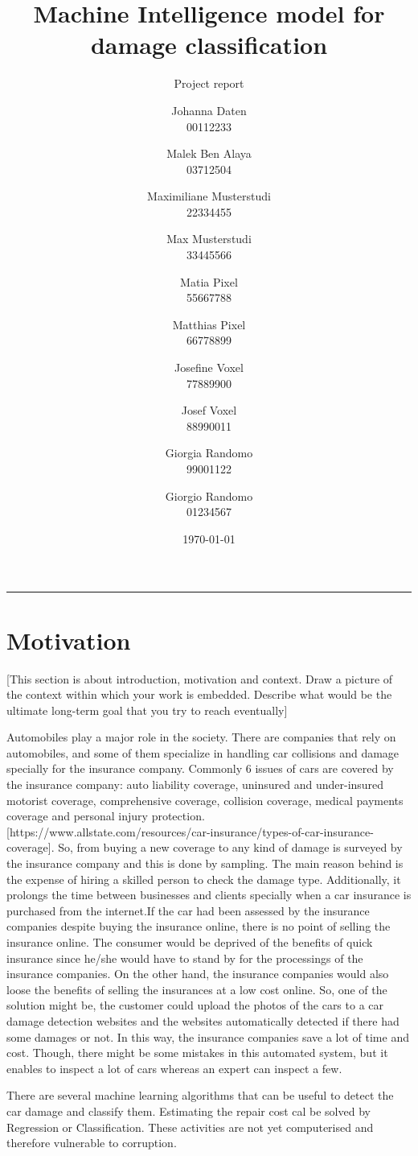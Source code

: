 \documentclass[lang=english,inputenc=utf8,fontsize=10pt]{ldvarticle}
\title{Machine Intelligence model for damage classification}
\subtitle{Project report}
\author{Johanna Daten\\
00112233
\and
Malek Ben Alaya\\
03712504
\and
Maximiliane Musterstudi\\
22334455
\and
Max Musterstudi\\
33445566
\and
Matia Pixel\\
55667788
\and
Matthias Pixel\\
66778899
\and
Josefine Voxel\\
77889900
\and
Josef Voxel\\
88990011
\and
Giorgia Randomo\\
99001122
\and
Giorgio Randomo\\
01234567
}
\date{\today}
\begin{document}
\maketitle
\thispagestyle{empty}

\hrule

\section*{Motivation}

[This section is about introduction, motivation and context. Draw a picture of the context within which your work is embedded. Describe what would be the ultimate long-term goal that you try to reach eventually] \newline

Automobiles play a major role in the society. There are companies that rely on automobiles, and some of them specialize in handling car collisions and damage specially for the insurance company. Commonly 6 issues of cars are covered by the insurance company: auto liability coverage, uninsured and under-insured motorist coverage, comprehensive coverage, collision coverage, medical payments coverage and personal injury protection. [https://www.allstate.com/resources/car-insurance/types-of-car-insurance-coverage]. So, from buying a new coverage to any kind of damage is surveyed by the insurance company and this is done by sampling. The main reason behind is the expense of hiring a skilled person to check the damage type. Additionally, it prolongs the time between businesses and clients specially when a car insurance is purchased from the internet.If the car had been assessed by the insurance companies despite buying the insurance online, there is no point of selling the insurance online. The consumer would be deprived of the benefits of quick insurance since he/she would have to stand by for the processings of the insurance companies. On the other hand, the insurance companies would also loose the benefits of selling the insurances at a low cost online. So, one of the solution might be, the customer could upload the photos of the cars to a car damage detection websites and the websites automatically detected if there had some damages or not. In this way, the insurance companies save a lot of time and cost. Though, there might be some mistakes in this automated system, but it enables to inspect a lot of cars whereas an expert can inspect a few.

There are several machine learning algorithms that can be useful to detect the car damage and classify them. Estimating the repair cost cal be solved by Regression or Classification. These activities are not yet computerised and therefore vulnerable to corruption. 
\end{document}

